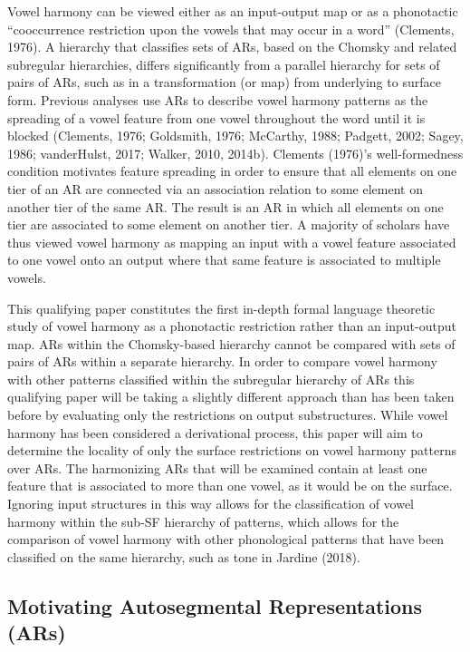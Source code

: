 \documentclass[floatsintext,man]{apa6}
\theoremstyle{definition}
\theoremstyle{definition}
\theoremstyle{definition}
\theoremstyle{remark}
\begin{document}
Vowel harmony can be viewed either as an input-output map or as a
phonotactic \enquote{cooccurrence restriction upon the vowels that may
occur in a word} (Clements, 1976). A hierarchy that classifies sets of
ARs, based on the Chomsky and related subregular hierarchies, differs
significantly from a parallel hierarchy for sets of pairs of ARs, such
as in a transformation (or map) from underlying to surface form.
Previous analyses use ARs to describe vowel harmony patterns as the
spreading of a vowel feature from one vowel throughout the word until it
is blocked (Clements, 1976; Goldsmith, 1976; McCarthy, 1988; Padgett,
2002; Sagey, 1986; vanderHulst, 2017; Walker, 2010, 2014b). Clements
(1976)'s well-formedness condition motivates feature spreading in order
to ensure that all elements on one tier of an AR are connected via an
association relation to some element on another tier of the same AR. The
result is an AR in which all elements on one tier are associated to some
element on another tier. A majority of scholars have thus viewed vowel
harmony as mapping an input with a vowel feature associated to one vowel
onto an output where that same feature is associated to multiple vowels.

This qualifying paper constitutes the first in-depth formal language
theoretic study of vowel harmony as a phonotactic restriction rather
than an input-output map. ARs within the Chomsky-based hierarchy cannot
be compared with sets of pairs of ARs within a separate hierarchy. In
order to compare vowel harmony with other patterns classified within the
subregular hierarchy of ARs this qualifying paper will be taking a
slightly different approach than has been taken before by evaluating
only the restrictions on output substructures. While vowel harmony has
been considered a derivational process, this paper will aim to determine
the locality of only the surface restrictions on vowel harmony patterns
over ARs. The harmonizing ARs that will be examined contain at least one
feature that is associated to more than one vowel, as it would be on the
surface. Ignoring input structures in this way allows for the
classification of vowel harmony within the sub-SF hierarchy of patterns,
which allows for the comparison of vowel harmony with other phonological
patterns that have been classified on the same hierarchy, such as tone
in Jardine (2018).

\subsection{Motivating Autosegmental Representations
(ARs)}\label{motivating-autosegmental-representations-ars}
\end{document}
